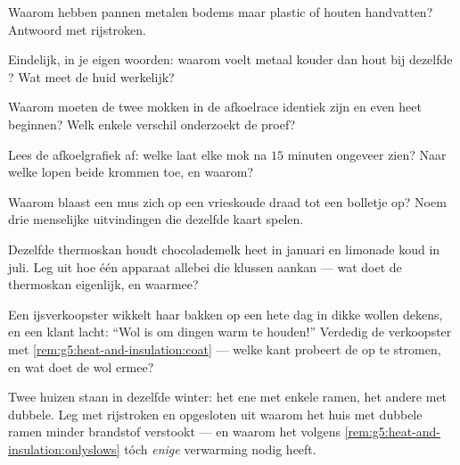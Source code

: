 \begin{exercise}[$\star$]\label{exo:g5:heat-and-insulation:4}
Waarom hebben pannen metalen bodems maar plastic of houten handvatten?
Antwoord met rijstroken.
\end{exercise}

\begin{exercise}[$\star$]\label{exo:g5:heat-and-insulation:5}
Eindelijk, in je eigen woorden: waarom voelt metaal kouder dan hout
bij dezelfde ? Wat meet de huid werkelijk?
\end{exercise}

\begin{exercise}[$\star$]\label{exo:g5:heat-and-insulation:6}
Waarom moeten de twee mokken in de afkoelrace identiek zijn en even
heet beginnen? Welk enkele verschil onderzoekt de proef?
\end{exercise}

\begin{exercise}[$\star$]\label{exo:g5:heat-and-insulation:7}
Lees de afkoelgrafiek af: welke  laat elke mok na $15$
minuten ongeveer zien? Naar welke  lopen beide krommen
toe, en waarom?
\end{exercise}

\begin{exercise}[$\star$]\label{exo:g5:heat-and-insulation:8}
Waarom blaast een mus zich op een vrieskoude draad tot een bolletje
op? Noem drie menselijke uitvindingen die dezelfde kaart spelen.
\end{exercise}

\begin{exercise}[$\star\star$]\label{exo:g5:heat-and-insulation:9}
Dezelfde thermoskan houdt chocolademelk heet in januari en limonade
koud in juli. Leg uit hoe één apparaat allebei die klussen aankan ---
wat doet de thermoskan eigenlijk, en waarmee?
\end{exercise}

\begin{exercise}[$\star\star$]\label{exo:g5:heat-and-insulation:10}
Een ijsverkoopster wikkelt haar bakken op een hete dag in dikke wollen
dekens, en een klant lacht: ``Wol is om dingen warm te houden!''
Verdedig de verkoopster met \cref{rem:g5:heat-and-insulation:coat} ---
welke kant probeert de  op te stromen, en wat doet de wol ermee?
\end{exercise}

\begin{exercise}[$\star\star$]\label{exo:g5:heat-and-insulation:11}
Twee huizen staan in dezelfde winter: het ene met enkele ramen, het
andere met dubbele. Leg met rijstroken en opgesloten  uit waarom
het huis met dubbele ramen minder brandstof verstookt --- en waarom
het volgens \cref{rem:g5:heat-and-insulation:onlyslows} tóch
\emph{enige} verwarming nodig heeft.
\end{exercise}
